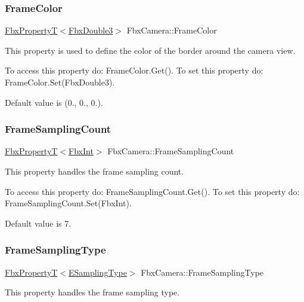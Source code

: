 \subsubsection{\texorpdfstring{Frame\+Color}{FrameColor}}
{\footnotesize\ttfamily \hyperlink{class_fbx_property_t}{Fbx\+PropertyT}$<$\hyperlink{fbxtypes_8h_ae0a96f14cde566774c7553aa7523b7a7}{Fbx\+Double3}$>$ Fbx\+Camera\+::\+Frame\+Color}

This property is used to define the color of the border around the camera view.

To access this property do\+: Frame\+Color.\+Get(). To set this property do\+: Frame\+Color.\+Set(\+Fbx\+Double3).

Default value is (0., 0., 0.). \mbox{\label{class_fbx_camera_a71ee6802b2a63149cfa33f11548893ea}} 
\subsubsection{\texorpdfstring{Frame\+Sampling\+Count}{FrameSamplingCount}}
{\footnotesize\ttfamily \hyperlink{class_fbx_property_t}{Fbx\+PropertyT}$<$\hyperlink{fbxtypes_8h_a088fa96de3b0b3ea69f0f6afef525dfb}{Fbx\+Int}$>$ Fbx\+Camera\+::\+Frame\+Sampling\+Count}

This property handles the frame sampling count.

To access this property do\+: Frame\+Sampling\+Count.\+Get(). To set this property do\+: Frame\+Sampling\+Count.\+Set(\+Fbx\+Int).

Default value is 7. \mbox{\label{class_fbx_camera_ab2048abc7b353f908a7c3caba7d0acf2}} 
\subsubsection{\texorpdfstring{Frame\+Sampling\+Type}{FrameSamplingType}}
{\footnotesize\ttfamily \hyperlink{class_fbx_property_t}{Fbx\+PropertyT}$<$\hyperlink{class_fbx_camera_aed549486ed0985230efca6fae0d731ae}{E\+Sampling\+Type}$>$ Fbx\+Camera\+::\+Frame\+Sampling\+Type}

This property handles the frame sampling type.

